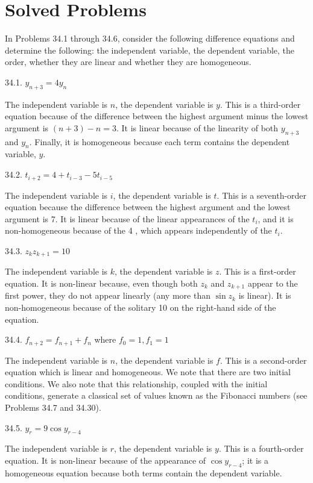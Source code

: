 \documentclass[10pt]{article}
\begin{document}
\section*{Solved Problems}
In Problems 34.1 through 34.6, consider the following difference equations and determine the following: the independent variable, the dependent variable, the order, whether they are linear and whether they are homogeneous.

34.1. $y_{n+3}=4 y_{n}$

The independent variable is $n$, the dependent variable is $y$. This is a third-order equation because of the difference between the highest argument minus the lowest argument is $(n+3)-n=3$. It is linear because of the linearity of both $y_{n+3}$ and $y_{n}$. Finally, it is homogeneous because each term contains the dependent variable, $y$.

34.2. $t_{i+2}=4+t_{i-3}-5 t_{i-5}$

The independent variable is $i$, the dependent variable is $t$. This is a seventh-order equation because the difference between the highest argument and the lowest argument is 7. It is linear because of the linear appearances of the $t_{i}$, and it is non-homogeneous because of the 4 , which appears independently of the $t_{i}$.

34.3. $z_{k} z_{k+1}=10$

The independent variable is $k$, the dependent variable is $z$. This is a first-order equation. It is non-linear because, even though both $z_{k}$ and $z_{k+1}$ appear to the first power, they do not appear linearly (any more than $\sin z_{k}$ is linear). It is non-homogeneous because of the solitary 10 on the right-hand side of the equation.

34.4. $f_{n+2}=f_{n+1}+f_{n}$ where $f_{0}=1, f_{1}=1$

The independent variable is $n$, the dependent variable is $f$. This is a second-order equation which is linear and homogeneous. We note that there are two initial conditions. We also note that this relationship, coupled with the initial conditions, generate a classical set of values known as the Fibonacci numbers (see Problems 34.7 and 34.30).

34.5. $y_{r}=9 \cos y_{r-4}$

The independent variable is $r$, the dependent variable is $y$. This is a fourth-order equation. It is non-linear because of the appearance of $\cos y_{r-4}$; it is a homogeneous equation because both terms contain the dependent variable.
\end{document}
